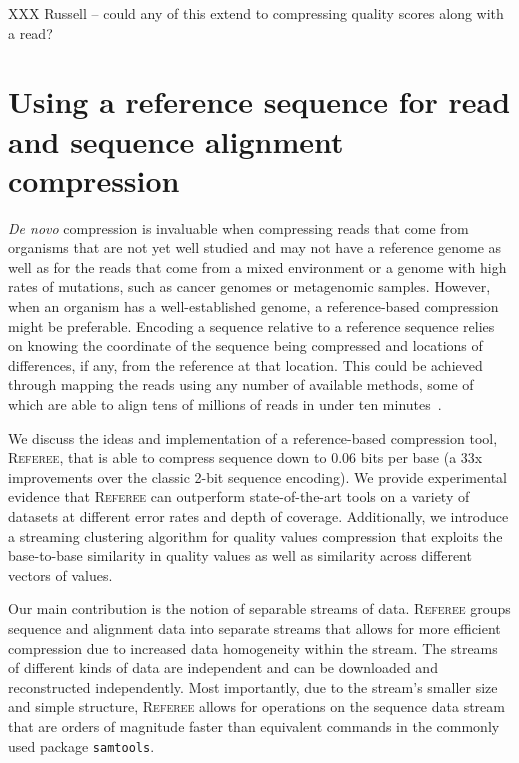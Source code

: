 \documentclass[12pt]{cmuthesis}
\newcommand{\refer}{\textsc{Referee}\xspace}
\begin{document}
  XXX Russell -- could any of this extend to compressing quality scores along with a read?

\chapter{Using a reference sequence for read and sequence alignment compression}

\textit{De novo} compression is invaluable when compressing reads that come from organisms that are not yet well studied and may not have a reference genome as well as for the reads that come from a mixed environment or a genome with high rates of mutations, such as cancer genomes or metagenomic samples. However, when an organism has a well-established genome, a reference-based compression might be preferable. Encoding a sequence relative to a reference sequence relies on knowing the coordinate of the sequence being compressed and locations of differences, if any, from the reference at that location. This could be achieved through mapping the reads using any number of available methods, some of which are able to align tens of millions of reads in under ten minutes~\cite{DobinSTAR}. 


We discuss the ideas and implementation of a reference-based compression tool, \refer, that is able to compress sequence down to 0.06 bits per base (a 33x improvements over the classic 2-bit sequence encoding). We provide experimental evidence that \refer can outperform state-of-the-art tools on a variety of datasets at different error rates and depth of coverage. Additionally, we introduce a streaming clustering algorithm for quality values compression that exploits the base-to-base similarity in quality values as well as similarity across different vectors of values.


Our main contribution is the notion of separable streams of data. \refer groups sequence and alignment data into separate streams that allows for more efficient compression due to increased data homogeneity within the stream. The streams of different kinds of data are independent and can be downloaded and reconstructed independently. Most importantly, due to the stream's smaller size and simple structure, \refer allows for operations on the sequence data stream that are orders of magnitude faster than equivalent commands in the commonly used package \texttt{samtools}.
\end{document}
